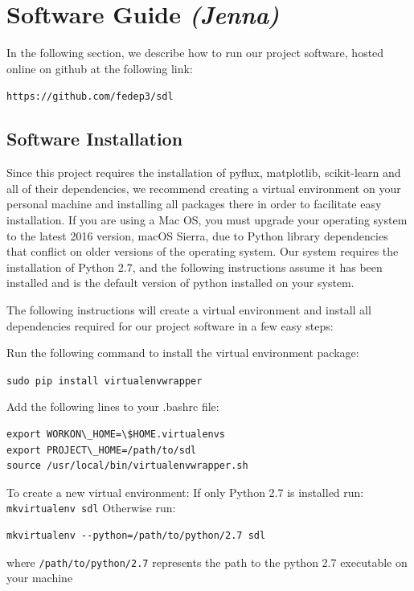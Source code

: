\documentclass{acm_proc_article-sp}
\begin{document}
%

%
%

\appendix
\section{Software Guide \textit{(Jenna)}}
In the following section, we describe how to run our project software, hosted online on github at the following link: 

\verb|https://github.com/fedep3/sdl|

\subsection{Software Installation}
Since this project requires the installation of pyflux, matplotlib, scikit-learn and all of their dependencies, we recommend creating a virtual environment on your personal machine and installing all packages there in order to facilitate easy installation. If you are using a Mac OS, you must upgrade your operating system to the latest 2016 version, macOS Sierra, due to Python library dependencies that conflict on older versions of the operating system. Our system requires the installation of Python 2.7, and the following instructions assume it has been installed and is the default version of python installed on your system. 

The following instructions will create a virtual environment and install all dependencies required for our project software in a few easy steps:

Run the following command to install the virtual environment package:

\verb|sudo pip install virtualenvwrapper|

Add the following lines to your .bashrc file:
\begin{verbatim}
export WORKON\_HOME=\$HOME.virtualenvs
export PROJECT\_HOME=/path/to/sdl
source /usr/local/bin/virtualenvwrapper.sh
\end{verbatim}

To create a new virtual environment:
If only Python 2.7 is installed run:
\verb|mkvirtualenv sdl|
Otherwise run:
\begin{verbatim}
mkvirtualenv --python=/path/to/python/2.7 sdl
\end{verbatim}
where \verb|/path/to/python/2.7| represents the path to the python 2.7 executable on your machine
\end{document}
